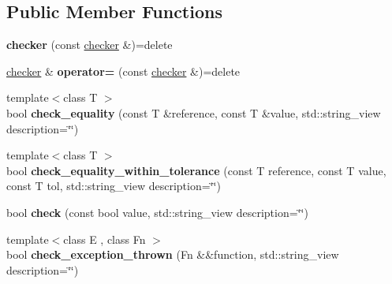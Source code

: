 \subsection*{Public Member Functions}
\begin{DoxyCompactItemize}
\item 
\mbox{\label{classsequoia_1_1unit__testing_1_1checker_a24b42e171583640dcb395ffb87fbd340}} 
{\bfseries checker} (const \mbox{\hyperlink{classsequoia_1_1unit__testing_1_1checker}{checker}} \&)=delete
\item 
\mbox{\label{classsequoia_1_1unit__testing_1_1checker_ab3c6d65efc4a4575d2091aa8e51ffb6a}} 
\mbox{\hyperlink{classsequoia_1_1unit__testing_1_1checker}{checker}} \& {\bfseries operator=} (const \mbox{\hyperlink{classsequoia_1_1unit__testing_1_1checker}{checker}} \&)=delete
\item 
\mbox{\label{classsequoia_1_1unit__testing_1_1checker_a9453ff792c3fc2d5474e2f29ab274c9b}} 
{\footnotesize template$<$class T $>$ }\\bool {\bfseries check\+\_\+equality} (const T \&reference, const T \&value, std\+::string\+\_\+view description=\char`\"{}\char`\"{})
\item 
\mbox{\label{classsequoia_1_1unit__testing_1_1checker_a7bf3db2dd543e1c285c4e6cb6ec5aa3f}} 
{\footnotesize template$<$class T $>$ }\\bool {\bfseries check\+\_\+equality\+\_\+within\+\_\+tolerance} (const T reference, const T value, const T tol, std\+::string\+\_\+view description=\char`\"{}\char`\"{})
\item 
\mbox{\label{classsequoia_1_1unit__testing_1_1checker_a12fff276e1d64944b703a9b878e86ddb}} 
bool {\bfseries check} (const bool value, std\+::string\+\_\+view description=\char`\"{}\char`\"{})
\item 
\mbox{\label{classsequoia_1_1unit__testing_1_1checker_a2ca24a9df22f7906246bba98b2357ab3}} 
{\footnotesize template$<$class E , class Fn $>$ }\\bool {\bfseries check\+\_\+exception\+\_\+thrown} (Fn \&\&function, std\+::string\+\_\+view description=\char`\"{}\char`\"{})

\end{DoxyCompactItemize}
